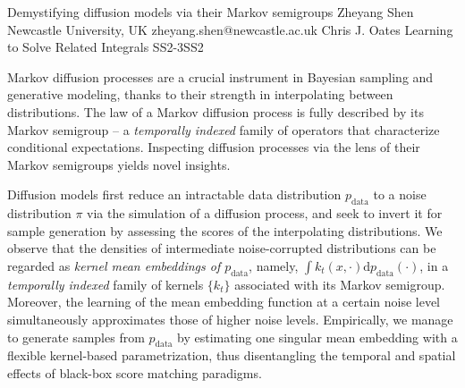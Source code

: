 \begin{talk}
  {Demystifying diffusion models via their Markov semigroups}%
  {Zheyang Shen}%
  {Newcastle University, UK}%
  {zheyang.shen@newcastle.ac.uk}%
  {Chris J. Oates}%
{Learning to Solve Related Integrals}
{}{SS2-3}{SS2}


Markov diffusion processes are a crucial instrument in Bayesian sampling and generative modeling, thanks to their strength in interpolating between distributions. The law of a Markov diffusion process is fully described by its Markov semigroup -- a \emph{temporally indexed} family of operators that characterize conditional expectations. Inspecting diffusion processes via the lens of their Markov semigroups yields novel insights. 

Diffusion models first reduce an intractable data distribution $p_{\text{data}}$ to a noise distribution $\pi$ via the simulation of a diffusion process, and seek to invert it for sample generation by assessing the scores of the interpolating distributions. We observe that the densities of intermediate noise-corrupted distributions can be regarded as \emph{kernel mean embeddings of $p_{\text{data}}$}, namely, $\int k_t(x, \cdot)\mathrm{d}p_{\text{data}}(\cdot)$, in a \emph{temporally indexed} family of kernels $\{k_t\}$ associated with its Markov semigroup. Moreover, the learning of the mean embedding function at a certain noise level simultaneously approximates those of higher noise levels. Empirically, we manage to generate samples from $p_{\text{data}}$ by estimating one singular mean embedding with a flexible kernel-based parametrization, thus disentangling the temporal and spatial effects of black-box score matching paradigms. 

\medskip

\end{talk}

